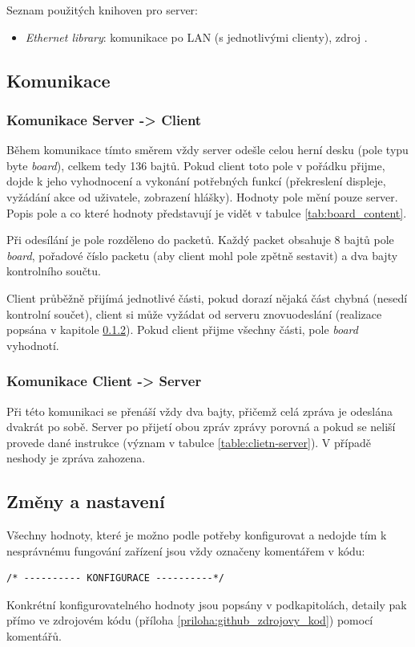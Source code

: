 \documentclass[a4paper,12pt, twoside]{article} %
\begin{document}
Seznam použitých knihoven pro server:
\begin{itemize}
\item \textit{Ethernet library}: komunikace po LAN (s jednotlivými clienty), zdroj \cite{library_ethernet}.
\end{itemize}
\subsection{Komunikace}
\subsubsection{Komunikace Server -> Client}
\label{sec:komunikace_server_client}
Během komunikace tímto směrem vždy server odešle celou herní desku (pole typu byte \textit{board}), celkem tedy 136 bajtů. Pokud client toto pole v pořádku přijme, dojde k jeho vyhodnocení a vykonání potřebných funkcí (překreslení displeje, vyžádání akce od uživatele, zobrazení hlášky). Hodnoty pole mění pouze server. Popis pole a co které hodnoty představují je vidět v tabulce \ref{tab:board_content}. 

Při odesílání je pole rozděleno do packetů. Každý packet obsahuje 8 bajtů pole \textit{board}, pořadové číslo packetu (aby client mohl pole zpětně sestavit) a dva bajty kontrolního součtu. 

Client průběžně přijímá jednotlivé části, pokud dorazí nějaká část chybná (nesedí kontrolní součet), client si může vyžádat od serveru znovuodeslání (realizace popsána v kapitole \ref{sec:komunikace_client_server}). Pokud client přijme všechny části, pole \textit{board} vyhodnotí.

%
\subsubsection{Komunikace Client -> Server}
\label{sec:komunikace_client_server}
Při této komunikaci se přenáší vždy dva bajty, přičemž celá zpráva je odeslána dvakrát po sobě. Server po přijetí obou zpráv zprávy porovná a pokud se neliší provede dané instrukce (význam v tabulce \ref{table:clietn-server}). V případě neshody je zpráva zahozena. 

\newpage
\subsection{Změny a nastavení}
Všechny hodnoty, které je možno podle potřeby konfigurovat a nedojde tím k nesprávnému fungování zařízení jsou vždy označeny komentářem v kódu:
\begin{verbatim}
/* ---------- KONFIGURACE ----------*/
\end{verbatim}
Konkrétní konfigurovatelného hodnoty jsou popsány v podkapitolách, detaily pak přímo ve zdrojovém kódu (příloha \ref{priloha:github_zdrojovy_kod}) pomocí komentářů.
\end{document}
